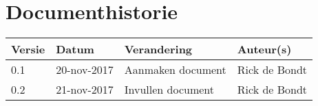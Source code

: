 \section{Documenthistorie}

\begin{tabularx}{\textwidth}{| l | l | X | l |}
    \hline
    \textbf{Versie} & \textbf{Datum} & \textbf{Verandering} & \textbf{Auteur(s)} \\ \hline
    0.1 & 20-nov-2017 & Aanmaken document & Rick de Bondt \\ \hline
    0.2 & 21-nov-2017 & Invullen document & Rick de Bondt \\ \hline
\end{tabularx}
